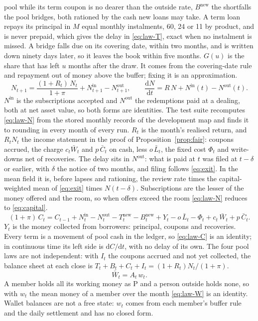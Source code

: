 pool while its term coupon is no dearer than the outside rate, $B^{\mathrm{new}}$ the shortfalls the pool bridges,
both rationed by the cash new loans may take. A term loan repays its principal in $M$ equal monthly
instalments, 60, 24 or 11 by product, and is never prepaid, which gives the delay in \eqref{eq:law-T}, exact when no
instalment is missed. A bridge falls due on its covering date, within two months, and is written down ninety days
later, so it leaves the book within five months. $G(u)$ is the share that has left $u$ months after the draw. It
comes from the covering-date rule and repayment out of money above the buffer; fixing it is an approximation.
\begin{equation}
N_{t+1} = \frac{(1+R_{t})\,N_{t}}{1+\pi} + N^{\mathrm{in}}_{t+1} - N^{\mathrm{out}}_{t+1},
\qquad
\frac{\mathrm{d}N}{\mathrm{d}t} = R\,N + N^{\mathrm{in}}(t) - N^{\mathrm{out}}(t) .
\label{eq:law-N}
\end{equation}
$N^{\mathrm{in}}$ is the subscriptions accepted and $N^{\mathrm{out}}$ the redemptions paid at a dealing, both at net
asset value, so both forms are identities. The test suite recomputes \eqref{eq:law-N} from the stored monthly
records of the development map and finds it to rounding in every month of every run. $R_{t}$ is the month's realised return, and $R_{t}N_{t}$ the income
statement in the proof of Proposition~\ref{prop:fair}: coupons accrued, the charge $c_{t}\bar W_{t}$ and
$p\,\bar C_{t}$ on cash, less $o\,\bar L_{t}$, the fixed cost $\Phi_{t}$ and write-downs net of recoveries. The delay
sits in $N^{\mathrm{out}}$: what is paid at $t$ was filed at $t-\delta$ or earlier, with $\delta$ the notice of two
months, and filing follows \eqref{eq:exit}. In the mean field it is, before lapses and rationing, the review rate
times the capital-weighted mean of \eqref{eq:exit} times $N(t-\delta)$. Subscriptions are the lesser of the money
offered and the room, so when offers exceed the room \eqref{eq:law-N} reduces to \eqref{eq:capital}.
\begin{equation}
(1+\pi)\,C_{t} = C_{t-1} + N^{\mathrm{in}}_{t} - N^{\mathrm{out}}_{t} - T^{\mathrm{new}}_{t} - B^{\mathrm{new}}_{t}
 + Y_{t} - o\,\bar L_{t} - \Phi_{t} + c_{t}\,\bar W_{t} + p\,\bar C_{t} .
\label{eq:law-C}
\end{equation}
$Y_{t}$ is the money collected from borrowers: principal, coupons and recoveries. Every term is a movement of pool
cash in the ledger, so \eqref{eq:law-C} is an identity; in continuous time its left side is
$\mathrm{d}C/\mathrm{d}t$, with no delay of its own. The four pool laws are not independent: with $I_{t}$ the
coupons accrued and not yet collected, the balance sheet at each close is $T_{t}+B_{t}+C_{t}+I_{t} =
(1+R_{t})N_{t}/(1+\pi)$.
\begin{equation}
\bar W_{t} = A_{t}\,w_{t} .
\label{eq:law-W}
\end{equation}
A member holds all its working money as P and a person outside holds none, so with $w_{t}$ the mean money of a
member over the month \eqref{eq:law-W} is an identity. Wallet balances are not a free state: $w_{t}$ comes from each
member's buffer rule and the daily settlement and has no closed form.

